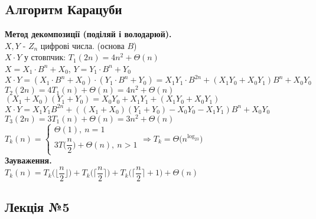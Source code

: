 \documentclass[a4paper,12pt]{article}
\begin{document}
    \subsection{Aлгоритм Карацуби}
    \textbf{Метод декомпозиції (поділяй і володарюй).} \\
    $X,Y$ - $Z_n$ цифрові числа. (основа $B$) \\
    $X\cdot Y$ у стовпчик: $T_1(2n)=4n^2+\Theta(n)$ \\
    $X=X_1\cdot B^n+X_0$, $Y=Y_1\cdot B^n+Y_0$ \\
    $X\cdot Y=(X_1\cdot B^n+X_0)\cdot(Y_1\cdot B^n+Y_0)=
    X_1Y_1\cdot B^{2n}+(X_1Y_0+X_0Y_1)B^n+X_0Y_0$ \\
    $T_2(2n)=4T_1(n)+\Theta(n)=4n^2+\Theta(n)$ \\
    $(X_1+X_0)(Y_1+Y_0)=X_0Y_0+X_1Y_1+(X_1Y_0+X_0Y_1)$ \\
    $X\cdot Y=X_1Y_1B^{2n}+((X_1+X_0)(Y_1+Y_0)-X_0Y_0-X_1Y_1)B^n+X_0Y_0$ \\
    $T_3(2n)=3T_1(n)+\Theta(n)=3n^2+\Theta(n)$ \\
    $T_k(n)=\begin{cases}
        \Theta(1),\:n=1 \\
        3T\Biggl(\dfrac{n}{2}\Biggr)+\Theta(n),\:n>1
    \end{cases}\Rightarrow T_k=\Theta\Biggl(n^{\log_23}\Biggr)$ \\
    \textbf{Зауваження.} \\
    $T_k(n)=T_k\Biggl(\bigg\lfloor\dfrac{n}{2}\bigg\rfloor\Biggr)+
    T_k\Biggl(\bigg\lceil\dfrac{n}{2}\bigg\rceil\Biggr)+
    T_k\Biggl(\bigg\lceil\dfrac{n}{2}\bigg\rceil+1\Biggr)+\Theta(n)$

\newpage
    \begin{center}
        \hrulefill
        \section{Лекція №5}
        \hrulefill
    \end{center}
\end{document}
